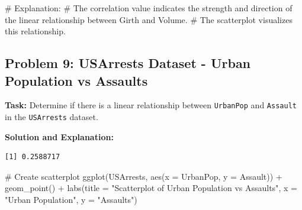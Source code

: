 \documentclass[
  letterpaper,
  DIV=11,
  numbers=noendperiod]{scrreprt}
\newenvironment{Shaded}{\begin{snugshade}}{\end{snugshade}}
\newcommand{\AttributeTok}[1]{\textcolor[rgb]{0.40,0.45,0.13}{#1}}
\newcommand{\CommentTok}[1]{\textcolor[rgb]{0.37,0.37,0.37}{#1}}
\newcommand{\FunctionTok}[1]{\textcolor[rgb]{0.28,0.35,0.67}{#1}}
\newcommand{\NormalTok}[1]{\textcolor[rgb]{0.00,0.23,0.31}{#1}}
\newcommand{\OtherTok}[1]{\textcolor[rgb]{0.00,0.23,0.31}{#1}}
\newcommand{\SpecialCharTok}[1]{\textcolor[rgb]{0.37,0.37,0.37}{#1}}
\newcommand{\StringTok}[1]{\textcolor[rgb]{0.13,0.47,0.30}{#1}}
\begin{document}
\begin{Shaded}
\begin{Highlighting}[]
\CommentTok{\# Explanation:}
\CommentTok{\# The correlation value indicates the strength and direction of the linear relationship between Girth and Volume.}
\CommentTok{\# The scatterplot visualizes this relationship.}
\end{Highlighting}
\end{Shaded}

\subsection*{Problem 9: USArrests Dataset - Urban Population vs
Assaults}\label{problem-9-usarrests-dataset---urban-population-vs-assaults}

\textbf{Task:} Determine if there is a linear relationship between
\texttt{UrbanPop} and \texttt{Assault} in the \texttt{USArrests}
dataset.

\textbf{Solution and Explanation:}

\begin{Shaded}
\end{Shaded}

\begin{verbatim}
[1] 0.2588717
\end{verbatim}

\begin{Shaded}
\begin{Highlighting}[]
\CommentTok{\# Create scatterplot}
\FunctionTok{ggplot}\NormalTok{(USArrests, }\FunctionTok{aes}\NormalTok{(}\AttributeTok{x =}\NormalTok{ UrbanPop, }\AttributeTok{y =}\NormalTok{ Assault)) }\SpecialCharTok{+}
  \FunctionTok{geom\_point}\NormalTok{() }\SpecialCharTok{+}
  \FunctionTok{labs}\NormalTok{(}\AttributeTok{title =} \StringTok{"Scatterplot of Urban Population vs Assaults"}\NormalTok{, }\AttributeTok{x =} \StringTok{"Urban Population"}\NormalTok{, }\AttributeTok{y =} \StringTok{"Assaults"}\NormalTok{)}
\end{Highlighting}
\end{Shaded}
\end{document}
